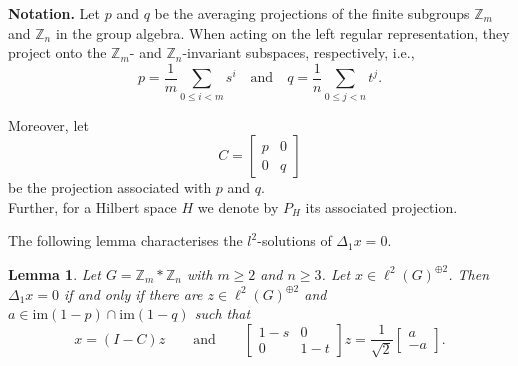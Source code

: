 \documentclass[a4paper,leqno,12pt]{article}
\numberwithin{equation}{section}
\theoremstyle{plain}
\newtheorem{lemma}[theoremcounter]{Lemma}
\theoremstyle{definition}
\theoremstyle{remark}
\begin{document}

\noindent \textbf{Notation.} Let $p$ and $q$ be the averaging projections of the finite subgroups $\mathbb{Z}_m$ and $\mathbb{Z}_n$ in the group algebra. When acting on the left regular representation, they project onto the $\mathbb{Z}_m$- and $\mathbb{Z}_n$-invariant subspaces, respectively, i.e.,
\begin{equation}
    \label{eq:pq}
    p=\frac{1}{m}{\sum_{0 \leq i < m}{s^i}} \quad \text{and} \quad 
    q=\frac{1} {n} {\sum_{0 \leq j <n}{t^j}}.
\end{equation}

    
	Moreover, let 
	\[
	C=\begin{bmatrix}p & 0 \\ 0 & q\end{bmatrix}
	\]
	be the projection associated with $p$ and $q$.
	\\
	Further, for a Hilbert space $H$ we denote by $P_{H}$ its associated projection.
	
	The following lemma characterises the $l^2$-solutions of $\Delta_1 x = 0$.
	
	\begin{lemma}
		\label{lem:SolDelta1}
		Let $G= \mathbb Z_m \ast \mathbb Z_n$ with $m \geq 2$ and $n \geq 3$. 
		Let $x\in \ell^2 (G)^{\oplus 2}$. Then 
		$\Delta_1 x =0$ 
		if and only if there are 
		$z\in \ell^2 (G)^{\oplus 2}$ and 
		$a\in \mathrm{im}(1-p)\cap\mathrm{im}(1-q)$
		such that 
		\[
		  x=(I - C)z  \qquad \text{and} \qquad		
		  \begin{bmatrix}1-s & 0 \\ 0 & {1-t}\end{bmatrix}z= \frac{1}{\sqrt 2}\begin{bmatrix}a\\ -a\end{bmatrix}. 
		\] 
	\end{lemma}
	
\end{document}
